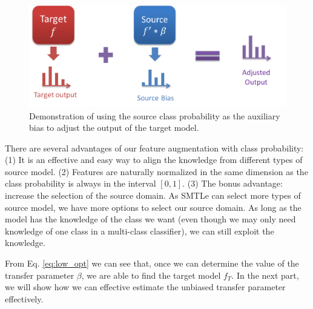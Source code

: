 \begin{figure}\label{fig:ab}
	\centering
	\includegraphics[scale=0.6]{fig/ab.png}
	\caption{Demonstration of using the source class probability as the auxiliary bias to adjust the output of the target model.}
\end{figure}

There are several advantages of our feature augmentation with class probability: (1) It is an effective and easy way to align the knowledge from different types of source model.
(2) Features are naturally normalized in the same dimension as the class probability is always in the interval $[0,1]$. (3) The bonus advantage: increase the selection of the source domain. As SMTLe can select more types of source model, we have more options to select our source domain. As long as the model has the knowledge of the class we want (even though we may only need knowledge of one class in a multi-class classifier), we can still exploit the knowledge.

From Eq. \eqref{eq:low_opt} we can see that, once we can determine the value of the transfer parameter $\beta$, we are able to find the target model $f_T$. In the next part, we will show how we can effective estimate the unbiased transfer parameter effectively.






